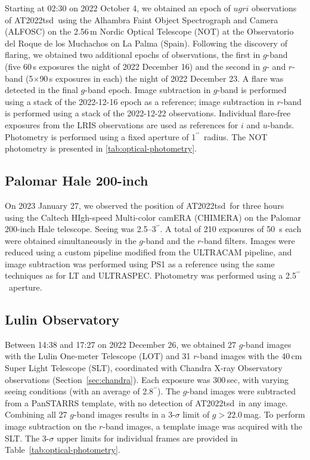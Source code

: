 \documentclass{nature_plusfigure}
\newcommand{\at}{AT2022tsd}
\newcommand{\arcsec}{$^{\prime\prime}$}
\begin{document}
\begin{methods}
Starting at 02:30 on 2022 October 4, we obtained an epoch of $ugri$ observations of \at\ using the Alhambra Faint Object Spectrograph and Camera (ALFOSC) on the 2.56\,m Nordic Optical Telescope (NOT) at the Observatorio del Roque de los Muchachos on La Palma (Spain). Following the discovery of flaring, we obtained two additional epochs of observations, the first in $g$-band (five 60\,s exposures the night of 2022 December 16) and the second in $g$- and $r$-band (5$\times$90\,s exposures in each) the night of 2022 December 23. A flare was detected in the final $g$-band epoch.  Image subtraction in $g$-band is performed using a stack of the 2022-12-16 epoch as a reference; image subtraction in $r$-band is performed using a stack of the 2022-12-22 observations.  Individual flare-free exposures from the LRIS observations are used as references for $i$ and $u$-bands.  Photometry is performed using a fixed aperture of 1\arcsec\ radius.
The NOT photometry is presented in \ref{tab:optical-photometry}.

\subsection{Palomar Hale 200-inch}
\label{sec:chimera}

On 2023 January 27, we observed the position of \at\ for three hours using the Caltech HIgh-speed Multi-color camERA (CHIMERA\cite{Harding2016}) on the Palomar 200-inch Hale telescope. Seeing was 2.5--3\arcsec.
A total of 210 exposures of 50~s each were obtained simultaneously in the $g$-band and the $r$-band filters. Images were reduced using a custom pipeline modified from the ULTRACAM pipeline\cite{Dhillon2007}, and image subtraction was performed using PS1 as a reference using the same techniques as for LT and ULTRASPEC. Photometry was performed using a 2.5\arcsec\ aperture.

\subsection{Lulin Observatory}
\label{sec:lulin}

Between 14:38 and 17:27 on 2022 December 26, we obtained 
27 $g$-band images with the Lulin One-meter Telescope (LOT) and 31 $r$-band images with the 40\,cm Super Light Telescope (SLT), coordinated with Chandra X-ray Observatory observations (Section~\ref{sec:chandra}). Each exposure was 300\,sec, with varying seeing conditions (with an average of 2.8\arcsec). The $g$-band images were subtracted from a PanSTARRS template, with no detection of \at\ in any image.
Combining all 27 $g$-band images results in a 3-$\sigma$ limit of $g>22.0$\,mag.
To perform image subtraction on the $r$-band images, a template image was acquired with the SLT.
The 3-$\sigma$ upper limits for individual frames are provided in Table~\ref{tab:optical-photometry}.


\end{methods}
\end{document}
